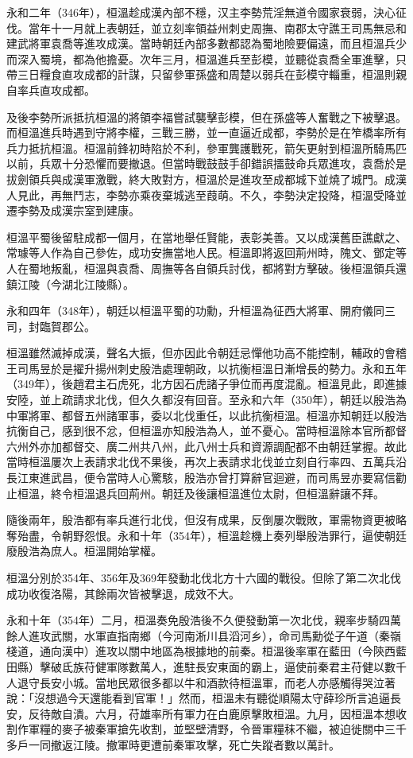 永和二年（346年），桓溫趁成漢內部不穩，汉主李勢荒淫無道令國家衰弱，決心征伐。當年十一月就上表朝廷，並立刻率領益州刺史周撫、南郡太守譙王司馬無忌和建武將軍袁喬等進攻成漢。當時朝廷內部多數都認為蜀地險要偏遠，而且桓溫兵少而深入蜀境，都為他擔憂。次年三月，桓溫進兵至彭模，並聽從袁喬全軍進擊，只帶三日糧食直攻成都的計謀，只留參軍孫盛和周楚以弱兵在彭模守輜重，桓溫則親自率兵直攻成都。

及後李勢所派抵抗桓溫的將領李福嘗試襲擊彭模，但在孫盛等人奮戰之下被擊退。而桓溫進兵時遇到守將李權，三戰三勝，並一直逼近成都，李勢於是在笮橋率所有兵力抵抗桓溫。桓溫前鋒初時陷於不利，參軍龔護戰死，箭矢更射到桓溫所騎馬匹以前，兵眾十分恐懼而要撤退。但當時戰鼓鼓手卻錯誤擂鼓命兵眾進攻，袁喬於是拔劍領兵與成漢軍激戰，終大敗對方，桓溫於是進攻至成都城下並燒了城門。成漢人見此，再無鬥志，李勢亦乘夜棄城逃至葭萌。不久，李勢決定投降，桓溫受降並遷李勢及成漢宗室到建康。

桓溫平蜀後留駐成都一個月，在當地舉任賢能，表彰美善。又以成漢舊臣譙獻之、常璩等人作為自己參佐，成功安撫當地人民。桓溫即將返回荊州時，隗文、鄧定等人在蜀地叛亂，桓溫與袁喬、周撫等各自領兵討伐，都將對方擊破。後桓溫領兵還鎮江陵（今湖北江陵縣）。

永和四年（348年），朝廷以桓溫平蜀的功勳，升桓溫為征西大將軍、開府儀同三司，封臨賀郡公。

桓溫雖然滅掉成漢，聲名大振，但亦因此令朝廷忌憚他功高不能控制，輔政的會稽王司馬昱於是擢升揚州刺史殷浩處理朝政，以抗衡桓溫日漸增長的勢力。永和五年（349年），後趙君主石虎死，北方因石虎諸子爭位而再度混亂。桓溫見此，即進據安陸，並上疏請求北伐，但久久都沒有回音。至永和六年（350年），朝廷以殷浩為中軍將軍、都督五州諸軍事，委以北伐重任，以此抗衡桓溫。桓溫亦知朝廷以殷浩抗衡自己，感到很不忿，但桓溫亦知殷浩為人，並不憂心。當時桓溫除本官所都督六州外亦加都督交、廣二州共八州，此八州士兵和資源調配都不由朝廷掌握。故此當時桓溫屢次上表請求北伐不果後，再次上表請求北伐並立刻自行率四、五萬兵沿長江東進武昌，便令當時人心驚駭，殷浩亦曾打算辭官迴避，而司馬昱亦要寫信勸止桓溫，終令桓溫退兵回荊州。朝廷及後讓桓溫進位太尉，但桓溫辭讓不拜。

隨後兩年，殷浩都有率兵進行北伐，但沒有成果，反倒屢次戰敗，軍需物資更被略奪殆盡，令朝野怨恨。永和十年（354年），桓溫趁機上奏列舉殷浩罪行，逼使朝廷廢殷浩為庶人。桓溫開始掌權。

桓溫分別於354年、356年及369年發動北伐北方十六國的戰役。但除了第二次北伐成功收復洛陽，其餘兩次皆被擊退，成效不大。

永和十年（354年）二月，桓溫奏免殷浩後不久便發動第一次北伐，親率步騎四萬餘人進攻武關，水軍直指南鄉（今河南淅川县滔河乡），命司馬勳從子午道（秦嶺棧道，通向漢中）進攻以關中地區為根據地的前秦。桓溫後率軍在藍田（今陝西藍田縣）擊破氐族苻健軍隊數萬人，進駐長安東面的霸上，逼使前秦君主苻健以數千人退守長安小城。當地民眾很多都以牛和酒款待桓溫軍，而老人亦感觸得哭泣著說：「沒想過今天還能看到官軍！」然而，桓溫未有聽從順陽太守薛珍所言追逼長安，反待敵自潰。六月，苻雄率所有軍力在白鹿原擊敗桓溫。九月，因桓溫本想收割作軍糧的麥子被秦軍搶先收割，並堅壁清野，令晉軍糧秣不繼，被迫徙關中三千多戶一同撤返江陵。撤軍時更遭前秦軍攻擊，死亡失蹤者數以萬計。

